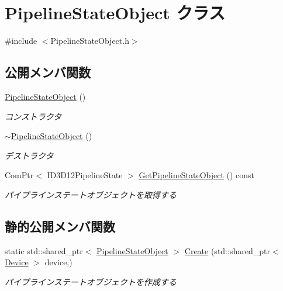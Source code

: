 \hypertarget{class_pipeline_state_object}{}\section{Pipeline\+State\+Object クラス}
\label{class_pipeline_state_object}


{\ttfamily \#include $<$Pipeline\+State\+Object.\+h$>$}

\subsection*{公開メンバ関数}
\begin{DoxyCompactItemize}
\item 
\mbox{\hyperlink{class_pipeline_state_object_a46d5d211ea123fa6079264bf337e3533}{Pipeline\+State\+Object}} ()
\begin{DoxyCompactList}\small\item\em コンストラクタ \end{DoxyCompactList}\item 
\mbox{\hyperlink{class_pipeline_state_object_a2281c5c6011269f011fda661ea434936}{$\sim$\+Pipeline\+State\+Object}} ()
\begin{DoxyCompactList}\small\item\em デストラクタ \end{DoxyCompactList}\item 
Com\+Ptr$<$ I\+D3\+D12\+Pipeline\+State $>$ \mbox{\hyperlink{class_pipeline_state_object_a82794a793dde36220e8cbe54f6620db6}{Get\+Pipeline\+State\+Object}} () const
\begin{DoxyCompactList}\small\item\em パイプラインステートオブジェクトを取得する \end{DoxyCompactList}\end{DoxyCompactItemize}
\subsection*{静的公開メンバ関数}
\begin{DoxyCompactItemize}
\item 
static std\+::shared\+\_\+ptr$<$ \mbox{\hyperlink{class_pipeline_state_object}{Pipeline\+State\+Object}} $>$ \mbox{\hyperlink{class_pipeline_state_object_a1eeacf254c88ede7ee5ec5c584d0a7eb}{Create}} (std\+::shared\+\_\+ptr$<$ \mbox{\hyperlink{class_device}{Device}} $>$ device,)
\begin{DoxyCompactList}\small\item\em パイプラインステートオブジェクトを作成する \end{DoxyCompactList}\end{DoxyCompactItemize}


